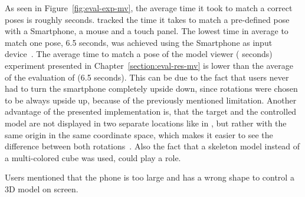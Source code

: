 As seen in Figure~\ref{fig:eval-exp-mv}, the average time it took to match a correct poses is roughly \evalExpMvAvgPoses{} seconds. \citeauthor{Katzakis.2010} tracked the time it takes to match a pre-defined pose with a Smartphone, a mouse and a touch panel. The lowest time in average to match one pose, 6.5 seconds, was achieved using the Smartphone as input device~\cite[140]{Katzakis.2010}. The average time to match a pose of the model viewer (\evalExpMvAvgPoses{} seconds) experiment presented in Chapter~\ref{section:eval-res-mv} is lower than the average of the evaluation of \citeauthor{Katzakis.2010} (6.5 seconds). This can be due to the fact that users never had to turn the smartphone completely upside down, since rotations were chosen to be always upside up, because of the previously mentioned limitation. Another advantage of the presented implementation is, that the target and the controlled model are not displayed in two separate locations like in {}, but rather with the same origin in the same coordinate space, which makes it easier to see the difference between both rotations~\cite[140]{Katzakis.2010}. Also the fact that a skeleton model instead of a multi-colored cube was used, could play a role. 

Users mentioned that the phone is too large and has a wrong shape to control a \ac{3D} model on screen. 

